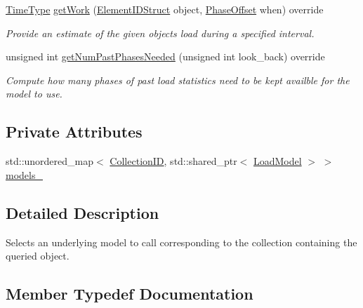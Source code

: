 \begin{DoxyCompactItemize}
\hyperlink{namespacevt_a876a9d0cd5a952859c72de8a46881442}{Time\+Type} \hyperlink{structvt_1_1vrt_1_1collection_1_1balance_1_1_per_collection_abe527a6f5cd861eb21c251d7d6afad0f}{get\+Work} (\hyperlink{structvt_1_1vrt_1_1collection_1_1balance_1_1_element_i_d_struct}{Element\+I\+D\+Struct} object, \hyperlink{structvt_1_1vrt_1_1collection_1_1balance_1_1_phase_offset}{Phase\+Offset} when) override
\begin{DoxyCompactList}\small\item\em Provide an estimate of the given object\textquotesingle{}s load during a specified interval. \end{DoxyCompactList}\item 
unsigned int \hyperlink{structvt_1_1vrt_1_1collection_1_1balance_1_1_per_collection_a1e2537d7294b8d1db3ed793d98dfb59c}{get\+Num\+Past\+Phases\+Needed} (unsigned int look\+\_\+back) override
\begin{DoxyCompactList}\small\item\em Compute how many phases of past load statistics need to be kept availble for the model to use. \end{DoxyCompactList}\end{DoxyCompactItemize}
\subsection*{Private Attributes}
\begin{DoxyCompactItemize}
\item 
std\+::unordered\+\_\+map$<$ \hyperlink{structvt_1_1vrt_1_1collection_1_1balance_1_1_per_collection_ade08a6857f727a0a9d1ef63b25fc5b71}{Collection\+ID}, std\+::shared\+\_\+ptr$<$ \hyperlink{structvt_1_1vrt_1_1collection_1_1balance_1_1_load_model}{Load\+Model} $>$ $>$ \hyperlink{structvt_1_1vrt_1_1collection_1_1balance_1_1_per_collection_aec76660b4a44fe451a9546b4f4c50d3d}{models\+\_\+}
\end{DoxyCompactItemize}


\subsection{Detailed Description}
Selects an underlying model to call corresponding to the collection containing the queried object. 

\subsection{Member Typedef Documentation}
\mbox{\label{structvt_1_1vrt_1_1collection_1_1balance_1_1_per_collection_ade08a6857f727a0a9d1ef63b25fc5b71}} 
